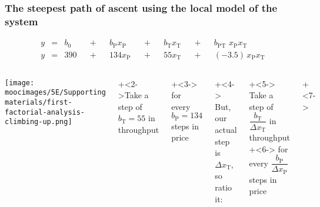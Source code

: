 \documentclass[handout,11pt,aspectratio=169,mathserif]{beamer}
\begin{document}
\begin{frame}\frametitle{The steepest {\color{myOrange}path of ascent} using the local model of the system}

	\begin{exampleblock}{}
		\begin{align*} 
			y &=& b_0 &&+&& b_\text{P} x_\text{P} &&+&& b_\text{T} x_\text{T} &&+&& b_\text{PT}\,\,x_\text{P}x_\text{T} \\
			y &=& 390 &&+&& 134 x_\text{P}        &&+&& 55 x_\text{T}         &&+&& (-3.5)\,x_\text{P}x_\text{T} 
		\end{align*}		
	\end{exampleblock}
	
	\begin{columns}[c]
			\centerline{\texttt{[image: \\moocimages/5E/Supporting materials/first-factorial-analysis-climbing-up.png]}}
		
			
			\vspace{.1cm}\onslide+<2->{\color{myGreen}Take a step of $b_\text{T}=55$ in throughput\\}
			
			\onslide+<3->{
				\color{myGreen}for every $b_\text{P}=134$ steps in price
			}
			
			\vspace{.3cm}
			\onslide+<4->{
				\color{myOrange}But, our actual step is $\Delta x_\text{T}$, so ratio it:
			}
			
			\vspace{.3cm}
			\onslide+<5->{
				\color{myGreen}Take a step of $\dfrac{b_\text{T}}{\Delta x_\text{T}}$ in throughput\\  
			}
			\onslide+<6->{
				\color{myGreen}for every $\dfrac{b_\text{P}}{\Delta x_\text{P}}$ steps in price
			}
			\vspace{0.3cm}
		
	   	 
			\onslide+<7->{
			}
		   	 
	\end{columns}
\end{frame}
\end{document}

